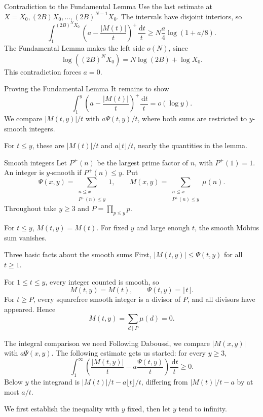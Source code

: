\documentclass[aspectratio=169,11pt]{beamer}
\newcommand{\dd}{\,\mathrm d}
\begin{document}
\begin{frame}{Contradiction to the Fundamental Lemma}
Use the last estimate at $X=X_0,(2B)X_0,\ldots,(2B)^{N-1}X_0$. The intervals have disjoint interiors, so
\[\int_1^{(2B)^NX_0}\left(a-\frac{|M(t)|}t\right)^+\frac{\dd t}t
\ge N\frac a4\log(1+a/8).\]
The Fundamental Lemma makes the left side $o(N)$, since
\[\log((2B)^NX_0)=N\log(2B)+\log X_0.\]
This contradiction forces $a=0$.
\end{frame}
\begin{frame}{Proving the Fundamental Lemma}
It remains to show
\[\int_1^y\left(a-\frac{|M(t)|}t\right)^+\frac{\dd t}t=o(\log y).\]
We compare $|M(t,y)|/t$ with $a\Psi(t,y)/t$, where both sums are restricted to $y$-smooth integers.

For $t\le y$, these are $|M(t)|/t$ and $a\lfloor t\rfloor/t$, nearly the quantities in the lemma.
\end{frame}
\begin{frame}{Smooth integers}
Let $P^+(n)$ be the largest prime factor of $n$, with $P^+(1)=1$. An integer is $y$-smooth if $P^+(n)\le y$. Put
\[\Psi(x,y)=\sum_{\substack{n\le x\\P^+(n)\le y}}1,\qquad
M(x,y)=\sum_{\substack{n\le x\\P^+(n)\le y}}\mu(n).\]
Throughout take $y\ge3$ and $P=\prod_{p\le y}p$.

For $t\le y$, $M(t,y)=M(t)$. For fixed $y$ and large enough $t$, the smooth M\"obius sum vanishes.
\end{frame}
\begin{frame}{Three basic facts about the smooth sums}
First, $|M(t,y)|\le\Psi(t,y)$ for all $t\ge1$.

For $1\le t\le y$, every integer counted is smooth, so
\[M(t,y)=M(t),\qquad\Psi(t,y)=\lfloor t\rfloor.\]
For $t\ge P$, every squarefree smooth integer is a divisor of $P$, and all divisors have appeared. Hence
\[M(t,y)=\sum_{d\mid P}\mu(d)=0.\]
\end{frame}
\begin{frame}{The integral comparison we need}
Following Daboussi, we compare $|M(x,y)|$ with $a\Psi(x,y)$. The following estimate gets us started: for every $y\ge3$,
\[\int_1^\infty\left(\frac{|M(t,y)|}t-a\frac{\Psi(t,y)}t\right)\frac{\dd t}t\ge0.\]
Below $y$ the integrand is $|M(t)|/t-a\lfloor t\rfloor/t$, differing from $|M(t)|/t-a$ by at most $a/t$.

We first establish the inequality with $y$ fixed, then let $y$ tend to infinity.
\end{frame}
\end{document}
